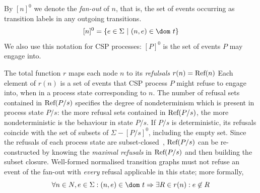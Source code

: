 By $[n]^0$ we denote the \emph{fan-out} of $n$, that is, the set of events occurring as transition labels in any outgoing transitions.
$$
[n]^0 = \{ e\in\Sigma~|~(n,e)\in\dom~t \}
$$
We also use this notation for CSP processes: $[P]^0$ is the set of events $P$ may engage into.




The total function $r$ maps each node $n$ to its \emph{refulsals} $r(n) = \text{Ref}(n)$ Each element of $r(n)$ is a set of events that 
CSP process $P$ might refuse to engage into, when in a process state corresponding to $n$.
The number of refusal sets contained in $\text{Ref}(P/s)$ specifies the degree of nondeterminism
which is present in process state $P/s$: the more refusal sets contained in  $\text{Ref}(P/s)$,
the more nondeterministic is the behaviour in state $P/s$. If $P/s$ is deterministic,
its refusals coincide with the set of subsets of $\Sigma - [P/s]^0$, including the 
empty set. Since the refusals of each process state are 
subset-closed~\cite{Hoare:1985:CSP:3921,Roscoe2010}, $\text{Ref}(P/s)$ can be re-constructed
by knowing the \emph{maximal refusals} in $\text{Ref}(P/s)$ and then  building the subset closure. Well-formed normalised transition graphs must not refuse an event of the fan-out
with {\it every} refusal applicable in this state; more formally,
\begin{equation}
\label{eq:wellformedg}
\forall n\in N, e\in\Sigma: (n,e)\in\dom~t \Rightarrow 
\exists R\in r(n): e\not\in R
\end{equation}







%

